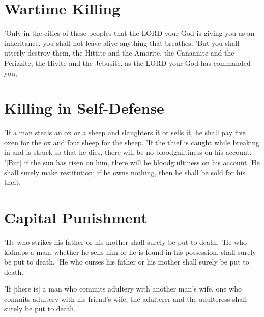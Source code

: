 \vspace{2\baselineskip}

\newpage
\section{Wartime Killing}
\begin{scripture}[Deuteronomy 20:16-17]
    'Only in the cities of these peoples that the LORD your God is giving you as an inheritance, you shall not leave alive anything that breathes.
    'But you shall utterly destroy them, the Hittite and the Amorite, the Canaanite and the Perizzite, the Hivite and the Jebusite, as the LORD your God has commanded you,
\end{scripture}

\vspace{2\baselineskip}

\section{Killing in Self-Defense}
\begin{scripture}[Exodus 22:1-3]
    'If a man steals an ox or a sheep and slaughters it or sells it, he shall pay five oxen for the ox and four sheep for the sheep.
    'If the thief is caught while breaking in and is struck so that he dies, there will be no bloodguiltiness on his account.
    '[But] if the sun has risen on him, there will be bloodguiltiness on his account. He shall surely make restitution; if he owns nothing, then he shall be sold for his theft.
\end{scripture}

\newpage
\section{Capital Punishment}
\begin{scripture}[Exodus 21:15-17]
    'He who strikes his father or his mother shall surely be put to death.
    'He who kidnaps a man, whether he sells him or he is found in his possession, shall surely be put to death.
    'He who curses his father or his mother shall surely be put to death.
\end{scripture}

\vspace{2\baselineskip}

\begin{scripture}[Leviticus 20:10]
    'If [there is] a man who commits adultery with another man's wife, one who commits adultery with his friend's wife, the adulterer and the adulteress shall surely be put to death.
\end{scripture}

